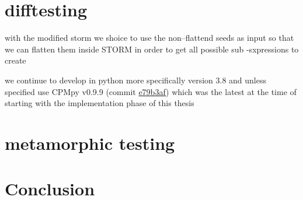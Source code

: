 %

\section{difftesting}
with the modified storm we shoice to use the non--flattend seeds as input so that we can flatten them inside STORM in order to get all possible sub -sxpressions to create 


we continue to develop in python more specifically version 3.8 and unless specified use CPMpy v0.9.9 (commit \href{https://github.com/CPMpy/cpmpy/commit/e79b3afedc934a9437c2ddb3a9f54d7e2d7bd3ee}{e79b3af}) which was the latest at the time of starting with the implementation phase of this thesis
\section{metamorphic testing}


\section{Conclusion}
\label{impl:conclusion}

